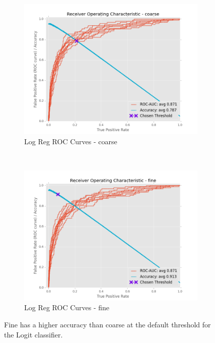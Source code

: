 \documentclass[ms]{nuthesis}
\begin{document}
\FloatBarrier
\begin{figure}[!htb]
    \centering
    \begin{subfigure}[t]{0.5\textwidth}
        \centering
        \includegraphics[width=\textwidth]{fig/LogReg_FindThreshold_RocCurve_coarse}
        \caption{Log Reg ROC Curves - coarse}
    \end{subfigure}%
    ~
    \begin{subfigure}[t]{0.5\textwidth}
        \centering
        \includegraphics[width=\textwidth]{fig/LogReg_FindThreshold_RocCurve_fine}
        \caption{Log Reg ROC Curves - fine}
    \end{subfigure}
    \caption{Fine has a higher accuracy than coarse at the default threshold for the Logit classifier.}
    \label{fig:LogRegThreshAcc}
\end{figure}
\FloatBarrier
\end{document}
